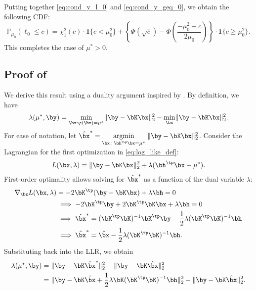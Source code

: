 \documentclass[11pt]{article}
\numberwithin{equation}{section}
\numberwithin{figure}{section}
\begin{document}
Putting together \eqref{eq:cond_y_l_0} and \eqref{eq:cond_y_geq_0}, we obtain the following CDF:
\begin{equation} 
    \mathbb{P}_{\mu_0} \left( \ell_0 \leq c \right) = \chi^2_1(c) \cdot \bm{1} \{ c < \mu_0^2 \} + \left\{ \Phi(\sqrt{c}) - \Phi\left( \frac{-\mu_0^2 - c}{2 \mu_0} \right) \right\} \cdot \bm{1} \{ c \geq \mu_0^2 \}.
\end{equation}
This completes the case of $\mu^* > 0$.

\subsection{Proof of }\label{proof:unconstrchi2}

We derive this result using a duality argument inspired by \cite{gourieroux}.
By definition, we have
\begin{equation} \label{eq:log_like_def}
    \lambda(\mu^*, \by) = \min_{\bx: \varphi(\bx) = \mu^*} \lVert \by - \bK \bx \rVert_2^2 - \min_{\bx} \lVert \by - \bK \bx \rVert_2^2.
\end{equation}
For ease of notation, let $\hat{\bx}^* = \underset{\bx \colon \bh^\tp\bx = \mu^*}{\text{argmin}} \; \lVert \by - \bK \bx \rVert_2^2$. 
Consider the Lagrangian for the first optimization in \eqref{eq:log_like_def}:
\begin{equation} \label{eq:lagrangian_unconstr}
    L(\bx, \lambda) = \lVert \by - \bK \bx \rVert^2_2 + \lambda (\bh^\tp \bx - \mu^*).
\end{equation}
First-order optimality allows solving for $\hat{\bx}^*$ as a function of the dual variable $\lambda$:
\begin{align*}
    \nabla_{\bx} L(\bx, \lambda) &= -2 \bK^\tp (\by - \bK \bx) + \lambda \bh = 0 \\
    &\implies -2 \bK^\tp \by + 2 \bK^\tp \bK \bx + \lambda \bh = 0 \\
    &\implies \hat{\bx}^* = (\bK^\tp \bK)^{-1} \bK^\tp \by - \frac{1}{2} \lambda (\bK^\tp \bK)^{-1} \bh \\
    &\implies \hat{\bx}^* = \hat{\bx} - \frac{1}{2} \lambda (\bK^\tp \bK)^{-1} \bh.
\end{align*}
Substituting back into the LLR, we obtain
\begin{align}
    \lambda(\mu^*, \by) &= \lVert \by - \bK \hat{\bx}^* \rVert_2^2 - \lVert \by - \bK \hat{\bx} \rVert_2^2 \nonumber \\
    &= \lVert \by - \bK \hat{\bx} + \frac{1}{2} \lambda \bK(\bK^\tp \bK)^{-1} \bh \rVert^2_2 - \lVert \by - \bK \hat{\bx} \rVert_2^2. \label{eq:reduction_log_lik}
\end{align}
\end{document}

